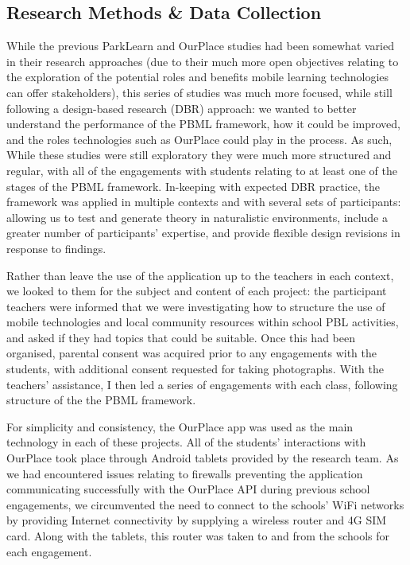 \subsection{Research Methods \& Data Collection}

While the previous ParkLearn and OurPlace studies had been somewhat varied in their research approaches (due to their much more open objectives relating to the exploration of the potential roles and benefits mobile learning technologies can offer stakeholders), this series of studies was much more focused, while still following a design-based research (DBR) approach: we wanted to better understand the performance of the PBML framework, how it could be improved, and the roles technologies such as OurPlace could play in the process. As such, While these studies were still exploratory they were much more structured and regular, with all of the engagements with students relating to at least one of the stages of the PBML framework. In-keeping with expected DBR practice, the framework was applied in multiple contexts and with several sets of participants: allowing us to test and generate theory in naturalistic environments, include a greater number of participants' expertise, and provide flexible design revisions in response to findings. 

Rather than leave the use of the application up to the teachers in each context, we looked to them for the subject and content of each project: the participant teachers were informed that we were investigating how to structure the use of mobile technologies and local community resources within school PBL activities, and asked if they had topics that could be suitable. Once this had been organised, parental consent was acquired prior to any engagements with the students, with additional consent requested for taking photographs. With the teachers' assistance, I then led a series of engagements with each class, following structure of the the PBML framework. 

For simplicity and consistency, the OurPlace app was used as the main technology in each of these projects. All of the students' interactions with OurPlace took place through Android tablets provided by the research team. As we had encountered issues relating to firewalls preventing the application communicating successfully with the OurPlace API during previous school engagements, we circumvented the need to connect to the schools' WiFi networks by providing Internet connectivity by supplying a wireless router and 4G SIM card. Along with the tablets, this router was taken to and from the schools for each engagement.

